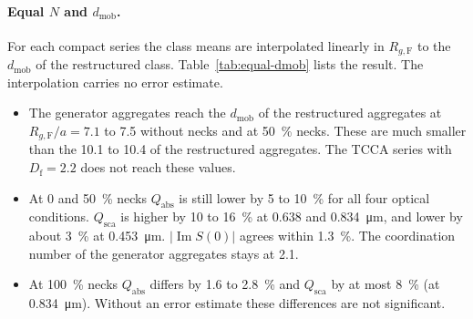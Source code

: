 \documentclass[11pt,a4paper]{article}
\newcommand{\Df}{D_\text{f}}
\begin{document}
\paragraph{Equal $N$ and $d_\text{mob}$.}
For each compact series the class means are interpolated linearly in $R_{g,\text{F}}$ to the $d_\text{mob}$ of the restructured class.
Table~\ref{tab:equal-dmob} lists the result.
The interpolation carries no error estimate.
\begin{itemize}
  \item The generator aggregates reach the $d_\text{mob}$ of the restructured aggregates at $R_{g,\text{F}}/a = 7.1$ to 7.5 without necks and at \SI{50}{\percent} necks.
        These are much smaller than the 10.1 to 10.4 of the restructured aggregates.
        The TCCA series with $\Df = 2.2$ does not reach these values.
  \item At 0 and \SI{50}{\percent} necks $Q_\text{abs}$ is still lower by 5 to \SI{10}{\percent} for all four optical conditions.
        $Q_\text{sca}$ is higher by 10 to \SI{16}{\percent} at 0.638 and \SI{0.834}{\micro\meter}, and lower by about \SI{3}{\percent} at \SI{0.453}{\micro\meter}.
        $\lvert\operatorname{Im} S(0)\rvert$ agrees within \SI{1.3}{\percent}.
        The coordination number of the generator aggregates stays at 2.1.
  \item At \SI{100}{\percent} necks $Q_\text{abs}$ differs by 1.6 to \SI{2.8}{\percent} and $Q_\text{sca}$ by at most \SI{8}{\percent} (at \SI{0.834}{\micro\meter}).
        Without an error estimate these differences are not significant.
\end{itemize}
\end{document}

